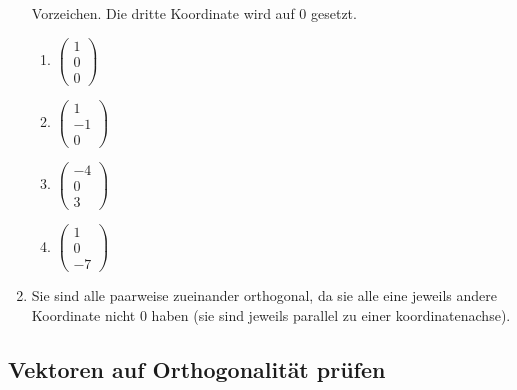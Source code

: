 \begin{enumerate}
  Vorzeichen. Die dritte Koordinate wird auf 0 gesetzt.
  \begin{multicols}{4}
    \begin{enumerate}
    \item $  
      \begin{pmatrix}
        1\\0\\0
      \end{pmatrix}
      $
    \item $  
      \begin{pmatrix}
        1\\-1\\0
      \end{pmatrix}
      $
    \item $  
      \begin{pmatrix}
        -4\\0\\3
      \end{pmatrix}
      $
    \item $  
      \begin{pmatrix}
        1\\0\\-7
      \end{pmatrix}
      $
    \end{enumerate}
  \end{multicols}
\item Sie sind alle paarweise zueinander orthogonal, da sie alle eine
  jeweils andere Koordinate nicht 0 haben (sie sind jeweils parallel
  zu einer koordinatenachse).
\end{enumerate}
\subsection{Vektoren auf Orthogonalität prüfen}
	
